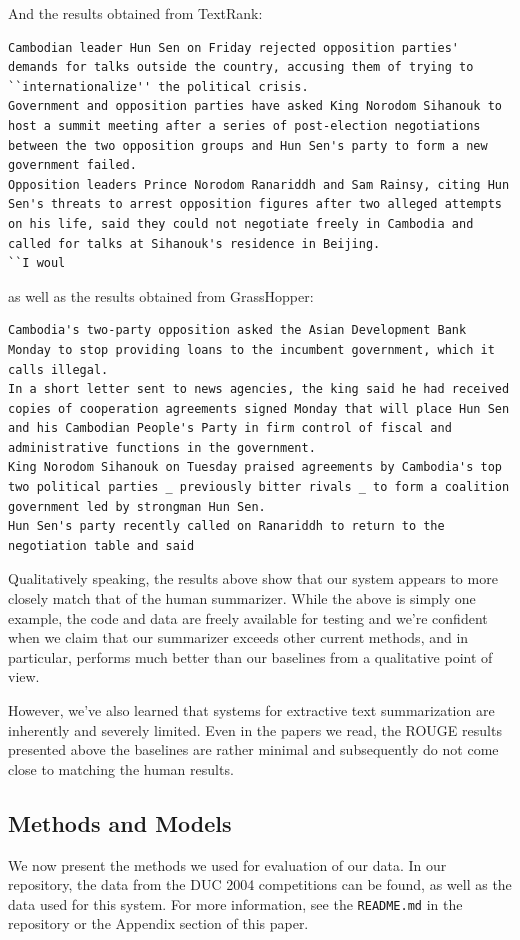 \documentclass[11pt]{article}
\begin{document}
And the results obtained from TextRank:
\begin{lstlisting}[breaklines]
Cambodian leader Hun Sen on Friday rejected opposition parties' demands for talks outside the country, accusing them of trying to ``internationalize'' the political crisis.
Government and opposition parties have asked King Norodom Sihanouk to host a summit meeting after a series of post-election negotiations between the two opposition groups and Hun Sen's party to form a new government failed.
Opposition leaders Prince Norodom Ranariddh and Sam Rainsy, citing Hun Sen's threats to arrest opposition figures after two alleged attempts on his life, said they could not negotiate freely in Cambodia and called for talks at Sihanouk's residence in Beijing.
``I woul
\end{lstlisting}

as well as the results obtained from GrassHopper:
\begin{lstlisting}[breaklines]
Cambodia's two-party opposition asked the Asian Development Bank Monday to stop providing loans to the incumbent government, which it calls illegal.
In a short letter sent to news agencies, the king said he had received copies of cooperation agreements signed Monday that will place Hun Sen and his Cambodian People's Party in firm control of fiscal and administrative functions in the government.
King Norodom Sihanouk on Tuesday praised agreements by Cambodia's top two political parties _ previously bitter rivals _ to form a coalition government led by strongman Hun Sen.
Hun Sen's party recently called on Ranariddh to return to the negotiation table and said
\end{lstlisting}


Qualitatively speaking, the results above show that our system appears to more closely match that of the human summarizer. While the above is simply one example, the code and data are freely available for testing and we're confident when we claim that our summarizer exceeds other current methods, and in particular, performs much better than our baselines from a qualitative point of view.

However, we've also learned that systems for extractive text summarization are inherently and severely limited. Even in the papers we read, the ROUGE results presented above the baselines are rather minimal and subsequently do not come close to matching the human results.

\subsection{Methods and Models}
We now present the methods we used for evaluation of our data. In our repository, the data from the DUC 2004 competitions can be found, as well as the data used for this system. For more information, see the \verb|README.md| in the repository or the Appendix section of this paper.
\end{document}
